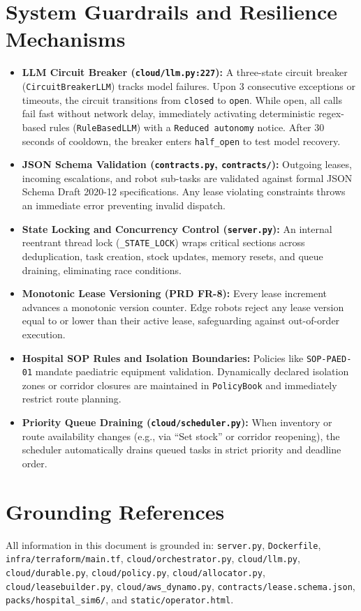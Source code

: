\documentclass[10pt,letterpaper]{article}
\begin{document}
\section{System Guardrails and Resilience Mechanisms}
\begin{itemize}
  \item \textbf{LLM Circuit Breaker (\texttt{cloud/llm.py:227}):} A three-state circuit breaker (\texttt{CircuitBreakerLLM}) tracks model failures. Upon 3 consecutive exceptions or timeouts, the circuit transitions from \texttt{closed} to \texttt{open}. While open, all calls fail fast without network delay, immediately activating deterministic regex-based rules (\texttt{RuleBasedLLM}) with a \texttt{Reduced autonomy} notice. After 30 seconds of cooldown, the breaker enters \texttt{half\_open} to test model recovery.
  \item \textbf{JSON Schema Validation (\texttt{contracts.py}, \texttt{contracts/}):} Outgoing leases, incoming escalations, and robot sub-tasks are validated against formal JSON Schema Draft 2020-12 specifications. Any lease violating constraints throws an immediate error preventing invalid dispatch.
  \item \textbf{State Locking and Concurrency Control (\texttt{server.py}):} An internal reentrant thread lock (\texttt{\_STATE\_LOCK}) wraps critical sections across deduplication, task creation, stock updates, memory resets, and queue draining, eliminating race conditions.
  \item \textbf{Monotonic Lease Versioning (PRD FR-8):} Every lease increment advances a monotonic version counter. Edge robots reject any lease version equal to or lower than their active lease, safeguarding against out-of-order execution.
  \item \textbf{Hospital SOP Rules and Isolation Boundaries:} Policies like \texttt{SOP-PAED-01} mandate paediatric equipment validation. Dynamically declared isolation zones or corridor closures are maintained in \texttt{PolicyBook} and immediately restrict route planning.
  \item \textbf{Priority Queue Draining (\texttt{cloud/scheduler.py}):} When inventory or route availability changes (e.g., via ``Set stock'' or corridor reopening), the scheduler automatically drains queued tasks in strict priority and deadline order.
\end{itemize}

\section{Grounding References}
{\sloppy All information in this document is grounded in: \texttt{server.py}, \texttt{Dockerfile}, \texttt{infra/terraform/main.tf}, \texttt{cloud/orchestrator.py}, \texttt{cloud/llm.py}, \texttt{cloud/durable.py}, \texttt{cloud/policy.py}, \texttt{cloud/allocator.py}, \texttt{cloud/leasebuilder.py}, \texttt{cloud/aws\_dynamo.py}, \texttt{contracts/lease.schema.json}, \texttt{packs/hospital\_sim6/}, and \texttt{static/operator.html}.\par}
\end{document}
